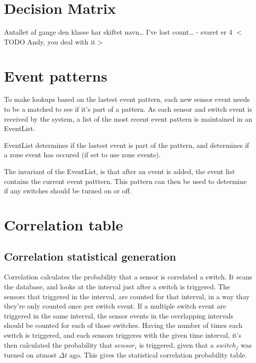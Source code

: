 \section{Decision Matrix}
\label{decisionmatrix}

Antallet af gange den klasse har skiftet navn{\ldots} I've lost count{\ldots}
 - svaret er 4
$<$TODO Andy, you deal with it$>$

\section{Event patterns}
\label{eventpatterns}

To make lookups based on the lastest event pattern, each new sensor event needs to be a matched to see if it's part of a pattern.
As each sensor and switch event is received by the system, a list of the most recent event pattern is maintained in an EventList. 

EventList determines if the lastest event is part of the pattern, and determines if a zone event has occured (if set to use zone events). 

The invariant of the EventList, is that after an event is added, the event list contains the current event patttern. This pattern can then be used to determine if any switches should be turned on or off.

\section{Correlation table}
\label{correlationtable}



\subsection{Correlation statistical generation}
\label{correlationstatisticalgeneration}

Correlation calculates the probability that a sensor is correlated a switch. It scans the database, and looks at the interval just after a switch is triggered. The sensors that triggered in the interval, are counted for that interval, in a way thay they're only counted once per switch event. If a multiple switch event are triggered in the same interval, the sensor events in the overlapping intervals should be counted for each of those switches. Having the number of times each switch is triggered, and each sensors triggeres with the given time interval, it's then calculated the probability that $ sensor_i $ is triggered, given that a $ switch_j $ was turned on atmost $ \Delta t $ ago. This gives the statistical correlation probability table. 

